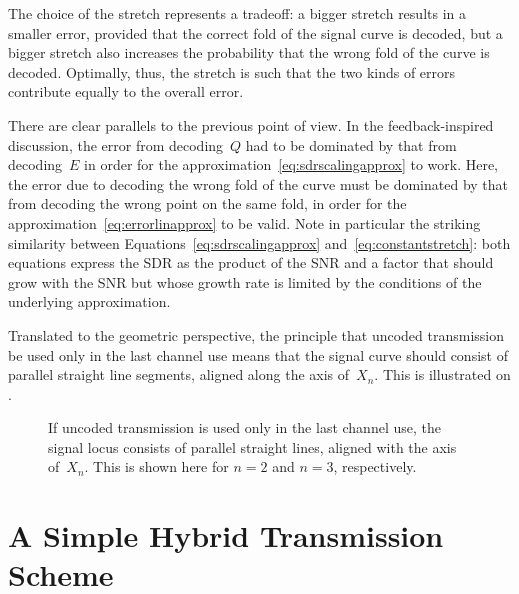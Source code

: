 The choice of the stretch represents a tradeoff: a bigger stretch results in a
smaller error, provided that the correct fold of the signal curve is decoded,
but a bigger stretch also increases the probability that the wrong fold of the
curve is decoded. Optimally, thus, the stretch is such that the two kinds of
errors contribute equally to the overall error. 

There are clear parallels to the previous point of view. In the
feedback-inspired discussion, the error from decoding~$Q$ had to be dominated by
that from decoding~$E$ in order for the
approximation~\eqref{eq:sdrscalingapprox} to work. Here, the error due to
decoding the wrong fold of the curve must be dominated by that from decoding the
wrong point on the same fold, in order for the
approximation~\eqref{eq:errorlinapprox} to be valid. Note in particular the
striking similarity between Equations~\ref{eq:sdrscalingapprox}
and~\ref{eq:constantstretch}: both equations express the SDR as the product of
the SNR and a factor that should grow with the SNR but whose growth rate is
limited by the conditions of the underlying approximation. 

Translated to the geometric perspective, the principle that uncoded transmission
be used only in the last channel use means that the signal curve should consist
of parallel straight line segments, aligned along the axis of~$X_n$. This is
illustrated on . 

\begin{figure}
  \centerline{%
  \subfloat[$n = 2$]{\label{fig:hybridlocus2}%
  }
  \hfil
  \subfloat[$n = 3$]{\label{fig:hybridlocus3}%
  }
  }
  \caption{If uncoded transmission is used only in the last channel use, the
  signal locus consists of parallel straight lines, aligned with the axis
  of~$X_n$. This is shown here for $n = 2$ and $n = 3$, respectively.}
  \label{fig:hybridlocus}
\end{figure}





\section{A Simple Hybrid Transmission Scheme}\label{sec:scalarquant}

